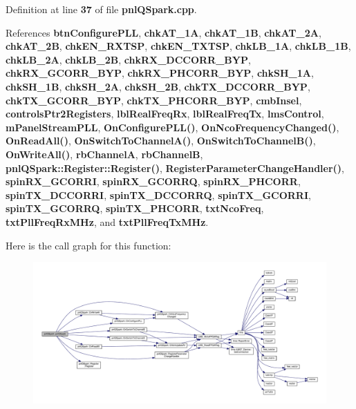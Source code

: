 Definition at line {\bf 37} of file {\bf pnl\+Q\+Spark.\+cpp}.



References {\bf btn\+Configure\+P\+LL}, {\bf chk\+A\+T\+\_\+1A}, {\bf chk\+A\+T\+\_\+1B}, {\bf chk\+A\+T\+\_\+2A}, {\bf chk\+A\+T\+\_\+2B}, {\bf chk\+E\+N\+\_\+\+R\+X\+T\+SP}, {\bf chk\+E\+N\+\_\+\+T\+X\+T\+SP}, {\bf chk\+L\+B\+\_\+1A}, {\bf chk\+L\+B\+\_\+1B}, {\bf chk\+L\+B\+\_\+2A}, {\bf chk\+L\+B\+\_\+2B}, {\bf chk\+R\+X\+\_\+\+D\+C\+C\+O\+R\+R\+\_\+\+B\+YP}, {\bf chk\+R\+X\+\_\+\+G\+C\+O\+R\+R\+\_\+\+B\+YP}, {\bf chk\+R\+X\+\_\+\+P\+H\+C\+O\+R\+R\+\_\+\+B\+YP}, {\bf chk\+S\+H\+\_\+1A}, {\bf chk\+S\+H\+\_\+1B}, {\bf chk\+S\+H\+\_\+2A}, {\bf chk\+S\+H\+\_\+2B}, {\bf chk\+T\+X\+\_\+\+D\+C\+C\+O\+R\+R\+\_\+\+B\+YP}, {\bf chk\+T\+X\+\_\+\+G\+C\+O\+R\+R\+\_\+\+B\+YP}, {\bf chk\+T\+X\+\_\+\+P\+H\+C\+O\+R\+R\+\_\+\+B\+YP}, {\bf cmb\+Insel}, {\bf controls\+Ptr2\+Registers}, {\bf lbl\+Real\+Freq\+Rx}, {\bf lbl\+Real\+Freq\+Tx}, {\bf lms\+Control}, {\bf m\+Panel\+Stream\+P\+LL}, {\bf On\+Configure\+P\+L\+L()}, {\bf On\+Nco\+Frequency\+Changed()}, {\bf On\+Read\+All()}, {\bf On\+Switch\+To\+Channel\+A()}, {\bf On\+Switch\+To\+Channel\+B()}, {\bf On\+Write\+All()}, {\bf rb\+ChannelA}, {\bf rb\+ChannelB}, {\bf pnl\+Q\+Spark\+::\+Register\+::\+Register()}, {\bf Register\+Parameter\+Change\+Handler()}, {\bf spin\+R\+X\+\_\+\+G\+C\+O\+R\+RI}, {\bf spin\+R\+X\+\_\+\+G\+C\+O\+R\+RQ}, {\bf spin\+R\+X\+\_\+\+P\+H\+C\+O\+RR}, {\bf spin\+T\+X\+\_\+\+D\+C\+C\+O\+R\+RI}, {\bf spin\+T\+X\+\_\+\+D\+C\+C\+O\+R\+RQ}, {\bf spin\+T\+X\+\_\+\+G\+C\+O\+R\+RI}, {\bf spin\+T\+X\+\_\+\+G\+C\+O\+R\+RQ}, {\bf spin\+T\+X\+\_\+\+P\+H\+C\+O\+RR}, {\bf txt\+Nco\+Freq}, {\bf txt\+Pll\+Freq\+Rx\+M\+Hz}, and {\bf txt\+Pll\+Freq\+Tx\+M\+Hz}.



Here is the call graph for this function\+:
\nopagebreak
\begin{figure}[H]
\begin{center}
\leavevmode
\includegraphics[width=350pt]{d5/d92/classpnlQSpark_a144727146c22d930542be934f1166e59_cgraph}
\end{center}
\end{figure}


